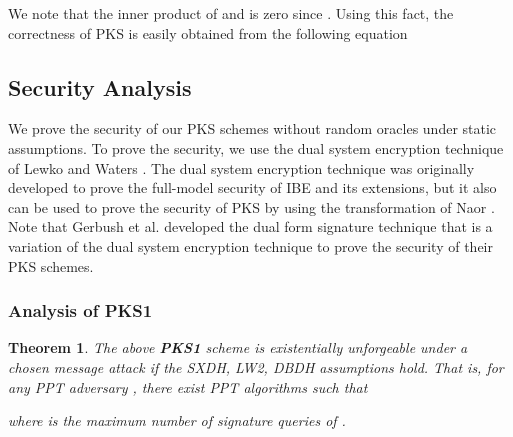 \documentclass[11pt,letterpaper]{article}
\newtheorem{theorem}{Theorem}[section]
\newcommand{\tb}[1]{\textbf{#1}}
\begin{document}
We note that the inner product of  and 
is zero since . Using this fact, the correctness
of PKS is easily obtained from the following equation
    

\subsection{Security Analysis}

We prove the security of our PKS schemes without random oracles under static
assumptions. To prove the security, we use the dual system encryption
technique of Lewko and Waters \cite{LewkoW10}. The dual system encryption
technique was originally developed to prove the full-model security of IBE
and its extensions, but it also can be used to prove the security of PKS by
using the transformation of Naor \cite{BonehF01}. Note that Gerbush et al.
\cite{GerbushLOW12} developed the dual form signature technique that is a
variation of the dual system encryption technique to prove the security of
their PKS schemes.

\subsubsection{Analysis of PKS1}

\begin{theorem} \label{thm:pks1-prime}
The above \tb{PKS1} scheme is existentially unforgeable under a chosen
message attack if the SXDH, LW2, DBDH assumptions hold. That is, for any PPT
adversary , there exist PPT algorithms 
such that
    
where  is the maximum number of signature queries of .
\end{theorem}
\end{document}
